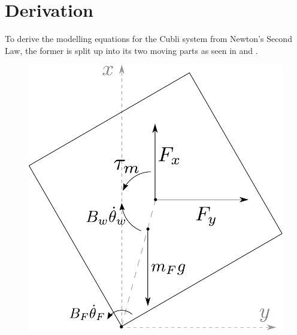 \section{Derivation}
To derive the modelling equations for the Cubli system from Newton's Second Law, the former is split up into its two moving parts as seen in  and .

  \begin{minipage}{\linewidth}
  	\begin{minipage}{0.45\linewidth}
  		\begin{figure}[H]
  			\includegraphics[scale=.5]{figures/freeBodyFrame}
  			\centering
  			\captionsetup{justification=centering}
  			\label{freeBodyFrame}
  		\end{figure}\vspace{-5mm}
  	\end{minipage}
  	\hspace{0.03\linewidth}
  	\begin{minipage}{0.45\linewidth}
  		\begin{figure}[H]

\end{figure}
\end{minipage}
\end{minipage}
